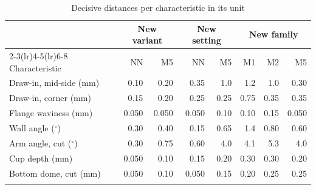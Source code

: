 \documentclass[pdflatex,sn-basic]{sn-jnl}
\newcommand{\tabsize}{\fontsize{8}{9.5}\selectfont}
\begin{document}
\begin{table}[tbp]
\tabsize
\setlength{\tabcolsep}{4pt}
\caption{Decisive distances per characteristic in its unit}\label{tab:units}
\begin{tabular}{@{}lrrrrrrr@{}}
\toprule
 & \multicolumn{2}{c}{New variant} & \multicolumn{2}{c}{New setting} & \multicolumn{3}{c}{New family} \\
\cmidrule(lr){2-3}\cmidrule(lr){4-5}\cmidrule(lr){6-8}
Characteristic & NN & M5 & NN & M5 & M1 & M2 & M5 \\
\midrule
Draw-in, mid-side (mm) & 0.10 & 0.20 & 0.35 & 1.0 & 1.2 & 1.0 & 0.30 \\
Draw-in, corner (mm) & 0.15 & 0.20 & 0.25 & 0.25 & 0.75 & 0.35 & 0.35 \\
Flange waviness (mm) & 0.050 & 0.050 & 0.050 & 0.10 & 0.10 & 0.15 & 0.050 \\
Wall angle ($^\circ$) & 0.30 & 0.40 & 0.15 & 0.65 & 1.4 & 0.80 & 0.60 \\
Arm angle, cut ($^\circ$) & 0.30 & 0.75 & 0.60 & 4.0 & 4.1 & 5.3 & 4.0 \\
Cup depth (mm) & 0.050 & 0.10 & 0.15 & 0.20 & 0.30 & 0.30 & 0.20 \\
Bottom dome, cut (mm) & 0.050 & 0.10 & 0.050 & 0.15 & 0.20 & 0.25 & 0.25 \\
\botrule
\end{tabular}
\end{table}
\end{document}
